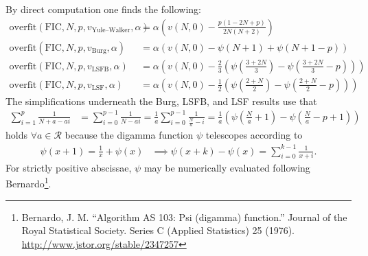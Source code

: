 \documentclass[12pt,letterpaper]{article}
\begin{document}
By direct computation one finds the following:
\begin{subequations}
\begin{align}
    \text{overfit}\!\left(\text{FIC},N,p,v_\text{Yule--Walker},\alpha\right)
    &=
    \alpha\left(
      v\!\left(N,0\right)
    - \frac{p \left(1-2 N+p\right)}{2 N \left(N+2\right)}
    \right)
\\
    \text{overfit}\!\left(\text{FIC},N,p,v_\text{Burg},\alpha\right)
    &=
    \alpha\left(
      v\!\left(N,0\right)
    - \psi\!\left(N+1\right)
    + \psi\!\left(N+1-p\right)
    \right)
\\
    \text{overfit}\!\left(\text{FIC},N,p,v_\text{LSFB},\alpha\right)
    &=
    \alpha\left(
      v\!\left(N,0\right)
    - \frac{2}{3} \left(
            \psi\!\left(\frac{3+2N}{3}\right)
          - \psi\!\left(\frac{3+2N}{3}-p\right)
      \right)
    \right)
\\
    \text{overfit}\!\left(\text{FIC},N,p,v_\text{LSF},\alpha\right)
    &=
    \alpha\left(
      v\!\left(N,0\right)
    - \frac{1}{2} \left(
            \psi\!\left(\frac{2+N}{2}\right)
          - \psi\!\left(\frac{2+N}{2}-p\right)
      \right)
    \right)
\end{align}
\end{subequations}
The simplifications underneath the Burg, LSFB, and LSF results use that
\begin{align}
    \sum_{i=1}^{p} \frac{1}{N+a-ai}
    &=
    \sum_{i=0}^{p-1} \frac{1}{N-ai}
    =
    \frac{1}{a} \sum_{i=0}^{p-1} \frac{1}{\frac{N}{a}-i}
    =
    \frac{1}{a} \left(
          \psi\!\left(\frac{N}{a}+1\right)
        - \psi\!\left(\frac{N}{a}-p+1\right)
    \right)
\end{align}
holds $\forall{}a\in\mathcal{R}$ because the digamma function $\psi$
telescopes according to
\begin{align}
    \psi\!\left(x+1\right)
    =
    \frac{1}{x}
    +
    \psi\!\left(x\right)
    &\implies
    \psi\!\left(x+k\right)
    -
    \psi\!\left(x\right)
    =
    \sum_{i=0}^{k-1} \frac{1}{x + i}
    .
\end{align}
For strictly positive abscissae, $\psi$ may be numerically evaluated following
Bernardo\footnote{Bernardo, J. M.  ``Algorithm AS 103: Psi (digamma)
function.'' Journal of the Royal Statistical Society.  Series C (Applied
Statistics) 25 (1976).  \url{http://www.jstor.org/stable/2347257}}.
\end{document}
